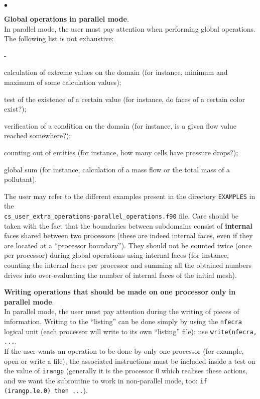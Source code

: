 {{{\begin{list}{$\bullet$}{}
\item {\bf Global operations in parallel mode}.\\
In parallel mode, the user must pay attention when performing
      global operations. The following list is not exhaustive:
        \begin{list}{-}{}
\item calculation of extreme values on the domain (for instance, minimum
      and maximum of some calculation values);
\item test of the existence of a certain value (for instance, do faces
      of a certain color exist?);
\item verification of a condition on the domain (for instance, is a
      given flow value reached somewhere?);
\item counting out of entities (for instance, how many cells have
      pressure drops?);
\item global sum (for instance, calculation of a mass flow or the total
      mass of a pollutant).
      \end{list}
The user may refer to the different examples present in the directory \texttt{EXAMPLES} in the\\
\texttt{cs\_user\_extra\_operations-parallel\_operations.f90} file.
Care should be taken with the fact that the boundaries between
      subdomains consist of {\bf internal} faces shared between
      two processors (these are indeed internal faces, even if they are
      located at a ``processor boundary''). They should not be counted twice
      (once per processor) during global operations using internal faces
      (for instance, counting the internal faces per processor and
      summing all the obtained numbers drives into over-evaluating the
      number of internal faces of the initial mesh).

\item {\bf Writing operations that should be made on one
      processor only in parallel mode}.\\
In parallel mode, the user must pay attention during the writing of
      pieces of information. Writing to the ``listing'' can be done
      simply by using the \texttt{nfecra} logical unit (each processor will write
      to its own ``listing'' file): use
      \texttt{write(nfecra, ...}. \\
If the user wants an operation to be done by only one processor (for
      example, open or write a file), the associated instructions must
      be included inside a test on the value of \texttt{irangp} (generally it is
      the processor 0 which realises these actions, and we want the
      subroutine to work in non-parallel mode, too: \texttt{if
      (irangp.le.0) then ...}).
\end{list}

}}}
